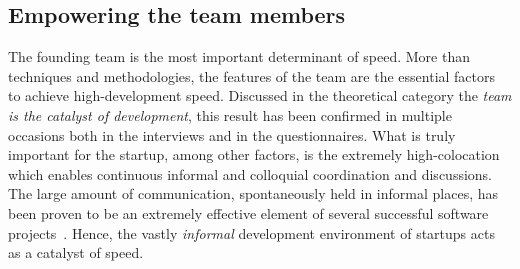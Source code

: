 \documentclass[10pt,journal,letterpaper,compsoc]{IEEEtran}
\begin{document}
\subsection{Empowering the team members} 
The founding team is the most important determinant of speed. More than 
techniques and methodologies, the features of the team are the essential factors 
to achieve high-development speed. Discussed in the theoretical category the 
\textit{team is the catalyst of development}, this result has been confirmed in 
multiple occasions both in the interviews and in the questionnaires. What is 
truly important for the startup, among other factors, is the extremely 
high-colocation which enables continuous informal and colloquial coordination 
and discussions. 
The large amount of communication, spontaneously held in informal places, has 
been proven to be an extremely effective element of several successful software 
projects~\cite{Highsmith2000}. Hence, the vastly \textit{informal} development 
environment of startups acts as a catalyst of speed. 

\end{document}
